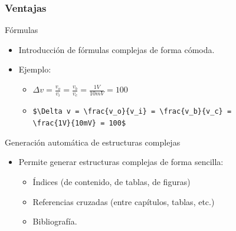 \documentclass[aspectratio=43]{beamer}%
\begin{document}
\begin{frame}[fragile]
\frametitle{\textbf{Ventajas}}
\justifying
 \begin{block}{Fórmulas}
\begin{itemize}\justifying
  \item Introducción de fórmulas complejas de forma cómoda.
  \item Ejemplo:
  \begin{itemize}\justifying
  \item $\Delta v = \frac{v_o}{v_i} = \frac{v_b}{v_c} = \frac{1V}{10mV} = 100$
  \item \verb+$\Delta v = \frac{v_o}{v_i} = \frac{v_b}{v_c} = +\\\verb+\frac{1V}{10mV} = 100$+
\end{itemize}

\end{itemize}

\end{block}

\begin{block}{Generación automática de estructuras complejas}
\begin{itemize}\justifying
  \item Permite generar estructuras complejas de forma sencilla:
  \begin{itemize}\justifying
  \item Índices (de contenido, de tablas, de figuras)
  \item Referencias cruzadas (entre capítulos, tablas, etc.)
  \item Bibliografía.
\end{itemize}

\end{itemize}

\end{block}


\end{frame}
\end{document}
